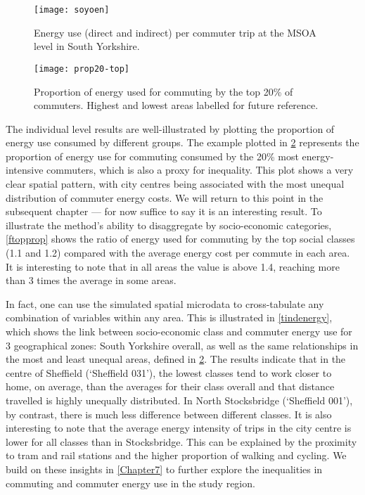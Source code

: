 \begin{figure}[htbp]
\begin{center}
    \texttt{[image: soyoen]}  \end{center}
  \caption[Commuter energy use in South Yorkshire.]
  {Energy use (direct and indirect) per commuter trip at the
  MSOA level in South Yorkshire.}
 \label{fsoyoen}
\end{figure}

\begin{figure}[htbp]
\begin{center}
    \texttt{[image: prop20-top]}  \end{center}
  \caption[Proportion of energy used for commuting by the top 20\%]
  {Proportion of energy used for commuting by the top 20\% of commuters.
  Highest and lowest areas labelled for future reference.}
 \label{fineq20}
\end{figure}

The individual level results are well-illustrated by plotting the proportion
of energy use consumed by different groups. The example plotted in
\cref{fineq20} represents the proportion of energy use for commuting
consumed by the 20\% most energy-intensive commuters, which is also a
proxy for inequality. This plot shows a very clear spatial pattern,
with city centres being associated with the most unequal distribution
of commuter energy costs. We will return to this point in the subsequent
chapter --- for now suffice to say it is an interesting result.
To illustrate the method's ability to disaggregate
by socio-economic categories, \cref{ftopprop} shows the ratio of energy
used for commuting by the top social classes (1.1 and 1.2) compared with
the average energy cost per commute in each area. It is interesting to
note that in all areas the value is above 1.4, reaching more than 3 times
the average in some areas.

In fact, one can use the simulated spatial microdata
to cross-tabulate any combination of variables within any area.
This is illustrated in \cref{tindenergy}, which shows the
link between socio-economic class and commuter energy use
for 3 geographical zones: South Yorkshire overall, as well as the same
relationships in the most and least unequal areas, defined in \cref{fineq20}.
The results indicate that in the centre of Sheffield (`Sheffield 031'),
the lowest classes tend to work closer to home, on average, than the averages for
their class overall and that distance travelled is highly unequally distributed.
In North Stocksbridge (`Sheffield 001'), by contrast, there is much less
difference between different classes. It is also interesting to note that
the average energy intensity of trips in the city centre is lower for all
classes than in Stocksbridge. This can be explained by the proximity to
tram and rail stations and the higher proportion of walking and cycling.
We build on these insights in \cref{Chapter7} to further explore the
inequalities in commuting and commuter energy use in the study region.

